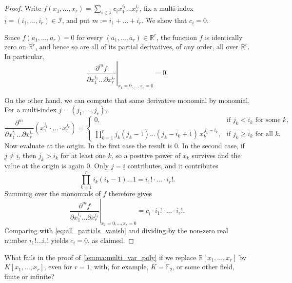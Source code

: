 \begin{proof}
  Write $f(x_1, \dots, x_r) = \sum_{\underline{i} \in \mathcal{I}} c_{\underline{i}} x_1^{i_1} \dots x_r^{i_r}$, fix a multi-index $\underline{i} = (i_1, \dots, i_r) \in \mathcal{I}$, and put $m := i_1 + \dots + i_r$. We show that $c_{\underline{i}} = 0$.

  Since $f(a_1, \dots, a_r) = 0$ for every $(a_1, \dots, a_r) \in \mathbb{R}^r$, the function $f$ is identically zero on $\mathbb{R}^r$, and hence so are all of its partial derivatives, of any order, all over $\mathbb{R}^r$. In particular,
  \begin{equation} \label{eq:all_partials_vanish}
    \left. \frac{\partial^m f}{\partial x_1^{i_1} \dots \partial x_r^{i_r}} \right|_{x_1 = 0, \dots, x_r = 0} = 0.
  \end{equation}

  On the other hand, we can compute that same derivative monomial by monomial. For a multi-index $\underline{j} = (j_1, \dots, j_r)$,
  \[
    \frac{\partial^m}{\partial x_1^{i_1} \dots \partial x_r^{i_r}} \left( x_1^{j_1} \cdot \dots \cdot x_r^{j_r} \right) =
    \begin{cases}
      0, & \text{if } j_k < i_k \text{ for some } k, \\[0.5em]
      \displaystyle \prod_{k=1}^r j_k (j_k - 1) \dots (j_k - i_k + 1) \, x_k^{\,j_k - i_k}, & \text{if } j_k \ge i_k \text{ for all } k.
    \end{cases}
  \]
  Now evaluate at the origin. In the first case the result is $0$. In the second case, if $\underline{j} \ne \underline{i}$, then $j_k > i_k$ for at least one $k$, so a positive power of $x_k$ survives and the value at the origin is again $0$. Only $\underline{j} = \underline{i}$ contributes, and it contributes
  \[ \prod_{k=1}^r i_k (i_k - 1) \dots 1 = i_1! \cdot \dots \cdot i_r!. \]
  Summing over the monomials of $f$ therefore gives
  \[ \left. \frac{\partial^m f}{\partial x_1^{i_1} \dots \partial x_r^{i_r}} \right|_{x_1 = 0, \dots, x_r = 0} = c_{\underline{i}} \cdot i_1! \cdot \dots \cdot i_r!. \]
  Comparing with \eqref{eq:all_partials_vanish} and dividing by the non-zero real number $i_1! \dots i_r!$ yields $c_{\underline{i}} = 0$, as claimed.
\end{proof}

\begin{exercise}\label{ex:multi_var_other_fields}
  What fails in the proof of \cref{lemma:multi_var_poly} if we replace $\mathbb{R}[x_1, \dots, x_r]$ by $K[x_1, \dots, x_r]$, even for $r = 1$, with, for example, $K = \mathbb{F}_2$, or some other field, finite or infinite?
\end{exercise}

